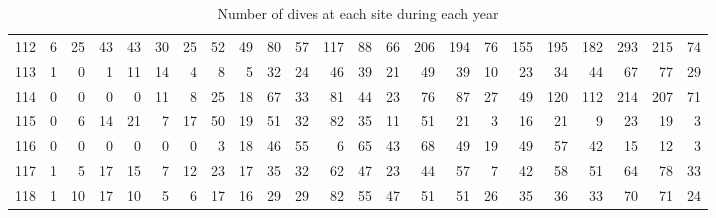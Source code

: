 \documentclass[a4paper]{article}
\begin{document}
\begin{sidewaystable}[h!]
\begin{tabular}{rrrrrrrrrrrrrrrrrrrrrrr}
  112 &   6 &  25 &  43 &  43 &  30 &  25 &  52 &  49 &  80 &  57 & 117 &  88 &  66 & 206 & 194 &  76 & 155 & 195 & 182 & 293 & 215 &  74 \\ 
  113 &   1 &   0 &   1 &  11 &  14 &   4 &   8 &   5 &  32 &  24 &  46 &  39 &  21 &  49 &  39 &  10 &  23 &  34 &  44 &  67 &  77 &  29 \\ 
  114 &   0 &   0 &   0 &   0 &  11 &   8 &  25 &  18 &  67 &  33 &  81 &  44 &  23 &  76 &  87 &  27 &  49 & 120 & 112 & 214 & 207 &  71 \\ 
  115 &   0 &   6 &  14 &  21 &   7 &  17 &  50 &  19 &  51 &  32 &  82 &  35 &  11 &  51 &  21 &   3 &  16 &  21 &   9 &  23 &  19 &   3 \\ 
  116 &   0 &   0 &   0 &   0 &   0 &   0 &   3 &  18 &  46 &  55 &   6 &  65 &  43 &  68 &  49 &  19 &  49 &  57 &  42 &  15 &  12 &   3 \\ 
  117 &   1 &   5 &  17 &  15 &   7 &  12 &  23 &  17 &  35 &  32 &  62 &  47 &  23 &  44 &  57 &   7 &  42 &  58 &  51 &  64 &  78 &  33 \\ 
  118 &   1 &  10 &  17 &  10 &   5 &   6 &  17 &  16 &  29 &  29 &  82 &  55 &  47 &  51 &  51 &  26 &  35 &  36 &  33 &  70 &  71 &  24 \\ 
   \hline
\end{tabular}
\caption{Number of dives at each site during each year} 
\label{table1}
\end{sidewaystable}

\end{document}
